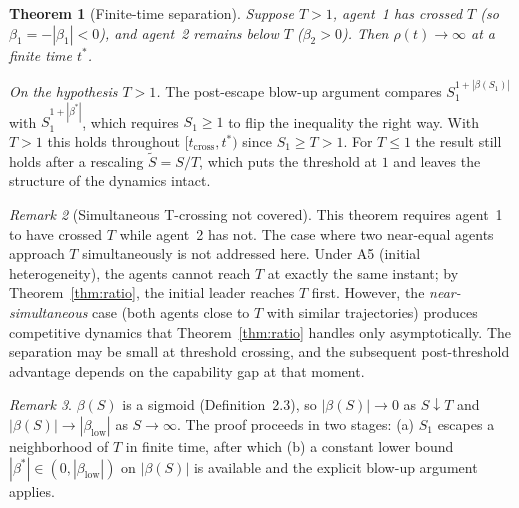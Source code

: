 \documentclass[11pt,letterpaper]{article}
\theoremstyle{plain}
\newtheorem{theorem}{Theorem}[section]
\theoremstyle{definition}
\theoremstyle{remark}
\newtheorem{remark}[theorem]{Remark}
\newcommand{\betaL}{\beta_{\mathrm{low}}}
\newcommand{\tcross}{t_{\mathrm{cross}}}
\newcommand{\tstar}{t^{*}}
\begin{document}
\begin{theorem}[Finite-time separation]
\label{thm:finitetime}
Suppose $T > 1$, agent~1 has crossed $T$ (so $\beta_1 = -|\beta_1| < 0$),
and agent~2 remains below $T$ ($\beta_2 > 0$).
Then $\rho(t) \to \infty$ at a finite time $\tstar$.
\end{theorem}

\noindent\textit{On the hypothesis $T > 1$.} The post-escape blow-up
argument compares $S_1^{1+|\beta(S_1)|}$ with $S_1^{1+|\beta^*|}$, which
requires $S_1 \geq 1$ to flip the inequality the right way.
With $T > 1$ this holds throughout $[\tcross, \tstar)$ since
$S_1 \geq T > 1$.
For $T \leq 1$ the result still holds after a rescaling
$\tilde{S} = S/T$, which puts the threshold at $1$ and leaves the
structure of the dynamics intact.

\begin{remark}[Simultaneous T-crossing not covered]
This theorem requires agent~1 to have crossed $T$ while agent~2 has not.
The case where two near-equal agents approach $T$ simultaneously is not
addressed here.
Under A5 (initial heterogeneity), the agents cannot reach $T$ at exactly the
same instant; by Theorem~\ref{thm:ratio}, the initial leader reaches $T$
first.
However, the \emph{near-simultaneous} case (both agents close to $T$ with
similar trajectories) produces competitive dynamics that Theorem~\ref{thm:ratio}
handles only asymptotically. The separation may be small at threshold
crossing, and the subsequent post-threshold advantage depends on the
capability gap at that moment.
\end{remark}

\begin{remark}
$\beta(S)$ is a sigmoid (Definition~2.3), so $|\beta(S)| \to 0$ as
$S \downarrow T$ and $|\beta(S)| \to |\betaL|$ as $S \to \infty$.
The proof proceeds in two stages: (a) $S_1$ escapes a neighborhood of $T$
in finite time, after which (b) a constant lower bound
$|\beta^*| \in (0, |\betaL|)$ on $|\beta(S)|$ is available and the explicit
blow-up argument applies.
\end{remark}
\end{document}
